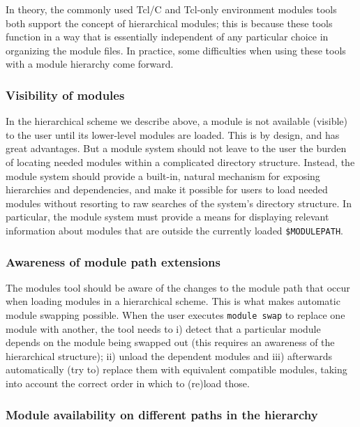 In theory, the commonly used Tcl/C and Tcl-only environment modules tools
both support the concept of hierarchical modules; this is because these tools
function in a way that is essentially independent of any particular choice in
organizing the module files. In practice, some difficulties when using these tools
with a module hierarchy come forward.

\subsubsection{Visibility of modules}
\label{sec:hierarchical_consequences_visibility}

In the hierarchical scheme we describe above, a module is not available (visible)
to the user until its lower-level  modules are loaded.  This
is by design, and has great advantages. But a module system should not leave to the
user the burden of locating needed modules within a complicated directory structure.  Instead, the module system should provide a built-in, natural mechanism for exposing hierarchies and
dependencies, and make it possible for users to load needed modules
without resorting to raw searches of the system's directory structure. In particular, the module system must provide a means for
displaying relevant information about modules that are outside the 
currently loaded \texttt{\small \$MODULEPATH}.

\subsubsection{Awareness of module path extensions}
\label{sec:hierarchical_consequences_extensions}

The modules tool should be aware of the changes  to the module path that
occur when loading modules in a hierarchical scheme. This is what makes
automatic module swapping possible. When the user executes \texttt{\small module swap} to replace one module with another, the tool needs to i) detect that a particular
module depends on the module being swapped out (this requires an awareness of
the hierarchical structure); ii) unload the dependent
modules and iii) afterwards
automatically (try to) replace them with equivalent compatible modules, taking into
account the correct order in which to (re)load those.

\subsubsection{Module availability on different paths in the hierarchy}
\label{sec:hierarchical_consequences_availability}

